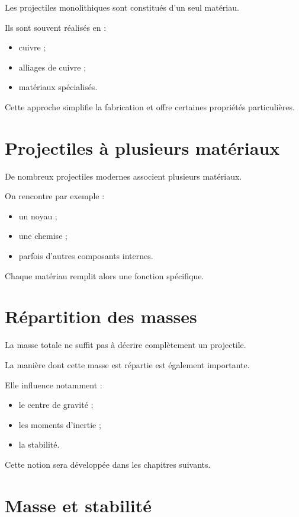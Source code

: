Les projectiles monolithiques sont constitués d'un seul matériau.

Ils sont souvent réalisés en :

\begin{itemize}
    \item cuivre ;
    \item alliages de cuivre ;
    \item matériaux spécialisés.
\end{itemize}

Cette approche simplifie la fabrication et offre certaines propriétés
particulières.

\section{Projectiles à plusieurs matériaux}

De nombreux projectiles modernes associent plusieurs matériaux.

On rencontre par exemple :

\begin{itemize}
    \item un noyau ;
    \item une chemise ;
    \item parfois d'autres composants internes.
\end{itemize}

Chaque matériau remplit alors une fonction spécifique.

\section{Répartition des masses}

La masse totale ne suffit pas à décrire complètement un projectile.

La manière dont cette masse est répartie est également importante.

Elle influence notamment :

\begin{itemize}
    \item le centre de gravité ;
    \item les moments d'inertie ;
    \item la stabilité.
\end{itemize}

Cette notion sera développée dans les chapitres suivants.

\section{Masse et stabilité}

